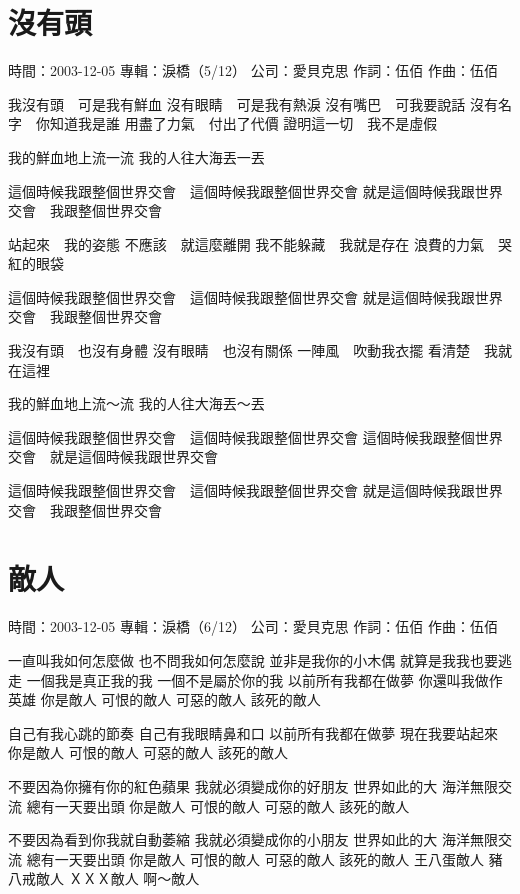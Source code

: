 \documentclass[UTF8,a4paper,oneside,twocolumn,12pt]{ctexbook}
\newcommand{\infopair}[2]{\textbullet #1：#2}
\newcommand{\zc}[1][伍佰]{\infopair{作詞}{#1}}
\newcommand{\zq}[1][伍佰]{\infopair{作曲}{#1}}
\newcommand{\zj}[1]{\infopair{專輯}{#1}}
\newcommand{\sj}[1]{\infopair{時間}{#1}}
\newcommand{\gs}[1]{\infopair{公司}{#1}}
\newenvironment{info}{\begin{flushleft}\kaishu
	}
	{\end{flushleft}\normalsize\yahei\par}
\newenvironment{lyric}{
	}
{}
\begin{document}
\section{沒有頭}
\begin{info}
	\sj{2003-12-05}
	\zj{淚橋（5/12）}
	\gs{愛貝克思}
	\zc
	\zq
\end{info}
\begin{lyric}
	我沒有頭　可是我有鮮血
	沒有眼睛　可是我有熱淚
	沒有嘴巴　可我要說話
	沒有名字　你知道我是誰
	用盡了力氣　付出了代價
	證明這一切　我不是虛假

	我的鮮血地上流一流
	我的人往大海丟一丟

	這個時候我跟整個世界交會　這個時候我跟整個世界交會
	就是這個時候我跟世界交會　我跟整個世界交會

	站起來　我的姿態
	不應該　就這麼離開
	我不能躲藏　我就是存在
	浪費的力氣　哭紅的眼袋

	這個時候我跟整個世界交會　這個時候我跟整個世界交會
	就是這個時候我跟世界交會　我跟整個世界交會

	我沒有頭　也沒有身體
	沒有眼睛　也沒有關係
	一陣風　吹動我衣擺
	看清楚　我就在這裡

	我的鮮血地上流～流
	我的人往大海丟～丟

	這個時候我跟整個世界交會　這個時候我跟整個世界交會
	這個時候我跟整個世界交會　就是這個時候我跟世界交會

	這個時候我跟整個世界交會　這個時候我跟整個世界交會
	就是這個時候我跟世界交會　我跟整個世界交會
\end{lyric}

\section{敵人}
\begin{info}
	\sj{2003-12-05}
	\zj{淚橋（6/12）}
	\gs{愛貝克思}
	\zc
	\zq
\end{info}
\begin{lyric}
	一直叫我如何怎麼做
	也不問我如何怎麼說
	並非是我你的小木偶
	就算是我我也要逃走
	一個我是真正我的我
	一個不是屬於你的我
	以前所有我都在做夢
	你還叫我做作英雄
	你是敵人
	可恨的敵人
	可惡的敵人
	該死的敵人

	自己有我心跳的節奏
	自己有我眼睛鼻和口
	以前所有我都在做夢
	現在我要站起來
	你是敵人
	可恨的敵人
	可惡的敵人
	該死的敵人

	不要因為你擁有你的紅色蘋果
	我就必須變成你的好朋友
	世界如此的大 海洋無限交流
	總有一天要出頭
	你是敵人
	可恨的敵人
	可惡的敵人
	該死的敵人

	不要因為看到你我就自動萎縮
	我就必須變成你的小朋友
	世界如此的大 海洋無限交流
	總有一天要出頭
	你是敵人
	可恨的敵人
	可惡的敵人
	該死的敵人
	王八蛋敵人
	豬八戒敵人
	ＸＸＸ敵人
	啊～敵人
\end{lyric}
\end{document}
